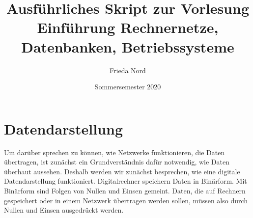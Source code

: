 \documentclass[a4paper,10pt]{article}
\title{Ausführliches Skript zur Vorlesung Einführung Rechnernetze, Datenbanken, Betriebssysteme}
\author{Frieda Nord}
\date{Sommersemester 2020}
\begin{document}
  \maketitle
  \tableofcontents

  \section{Datendarstellung}
  Um darüber sprechen zu können, wie Netzwerke funktionieren, die Daten übertragen,
  ist zunächst ein Grundverständnis dafür notwendig, wie Daten überhaut aussehen.
  Deshalb werden wir zunächst besprechen, wie eine digitale Datendarstellung
  funktioniert. Digitalrechner speichern Daten in Binärform. Mit Binärform sind
  Folgen von Nullen und Einsen gemeint. Daten, die auf Rechnern gespeichert oder
  in einem Netzwerk übertragen werden sollen, müssen also durch Nullen und Einsen
  ausgedrückt werden.


\end{document}
